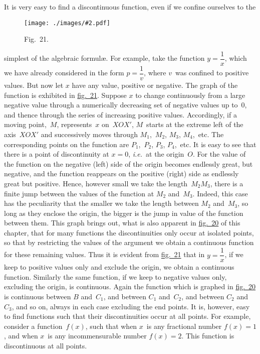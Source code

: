 \documentclass[12pt,leqno]{book}[2005/09/16]
\newcommand{\Graphic}[2]{%
  \phantomsection\label{fig:#2}%
  \texttt{[image: ./images/\#2.pdf]}%
}
\newcommand{\DefWidth}{4in}%
\newcommand{\Figure}[2][\DefWidth]{%
  \begin{figure}[hbt!]
    \centering
    \phantomsection\label{fig:#2}
    \Graphic{#1}{fig#2}
    \caption{Fig.~#2.}
  \end{figure}\ignorespaces%
}
\newcommand{\Fig}[2][Fig.]{\hyperref[fig:#2]{#1~#2}}
\newcommand{\PageSep}[1]{\ignorespaces}
\newcommand{\ie}{\emph{i.e.}}
\begin{document}
It is very easy to find a discontinuous
function, even if we confine ourselves to the
\Figure{21}
simplest of the algebraic formulæ. For example,
take the function $y = \dfrac{1}{x}$, which we
have already considered in the form $p = \dfrac{1}{v}$,
where $v$~was confined to positive values. But
\PageSep{154}
now let $x$ have any value, positive or negative.
The graph of the function is exhibited in \Fig[fig.]{21}.
Suppose $x$ to change continuously from
a large negative value through a numerically
decreasing set of negative values up to~$0$, and
thence through the series of increasing positive
values. Accordingly, if a moving point,~$M$,
represents~$x$ on~$XOX'$, $M$~starts at the
extreme left of the axis~$XOX'$ and successively
moves through $M_{1}$,~$M_{2}$, $M_{3}$, $M_{4}$,~etc.
The corresponding points on the function are
$P_{1}$,~$P_{2}$, $P_{3}$, $P_{4}$,~etc. It is easy to see that
there is a point of discontinuity at $x = 0$, \ie~at
the origin~$O$. For the value of the function
on the negative (left) side of the origin becomes
endlessly great, but negative, and the
function reappears on the positive (right)
side as endlessly great but positive. Hence,
however small we take the length~$M_{2} M_{3}$,
there is a finite jump between the values of
the function at $M_{2}$ and~$M_{3}$. Indeed, this case
has the peculiarity that the smaller we take the
length between $M_{2}$ and~$M_{3}$, so long as they
enclose the origin, the bigger is the jump in
value of the function between them. This
graph brings out, what is also apparent in
\Fig[fig.]{20} of this chapter, that for many functions
the discontinuities only occur at isolated
points, so that by restricting the values of the
argument we obtain a continuous function for
these remaining values. Thus it is evident
\PageSep{155}
from \Fig[fig.]{21} that in $y = \dfrac{1}{x}$, if we keep to positive
values only and exclude the origin, we obtain
a continuous function. Similarly the same
function, if we keep to negative values only,
excluding the origin, is continuous. Again
the function which is graphed in \Fig[fig.]{20} is continuous
between $B$ and~$C_{1}$, and between $C_{1}$
and~$C_{2}$, and between $C_{2}$ and $C_{3}$, and so on,
always in each case excluding the end points.
It is, however, easy to find functions such that
their discontinuities occur at all points. For
example, consider a function~$f(x)$, such that
when $x$~is any fractional number $f(x) = 1$, and
when $x$~is any incommensurable number
$f(x) = 2$. This function is discontinuous at all
points.
\end{document}
